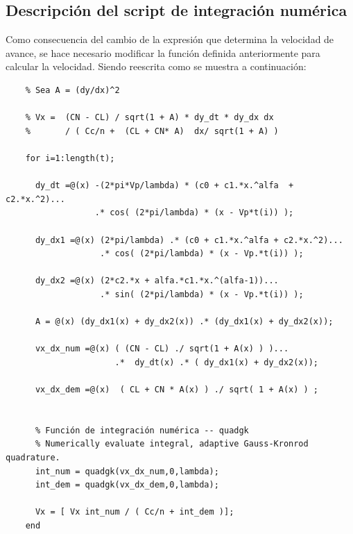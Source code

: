 \subsection{Descripción del script de integración numérica} \label{sec:descripcion_script2}
Como consecuencia del cambio de la expresión que determina la velocidad de avance, se hace necesario modificar la función definida anteriormente para calcular la velocidad. Siendo reescrita como se muestra a continuación:
\begin{lstlisting}[]
	%% Calculo de la velocidad de avance por integración numérica.
    % Sea A = (dy/dx)^2
    
    % Vx =  (CN - CL) / sqrt(1 + A) * dy_dt * dy_dx dx 
    %       / ( Cc/n +  (CL + CN* A)  dx/ sqrt(1 + A) )

    for i=1:length(t);

      dy_dt =@(x) -(2*pi*Vp/lambda) * (c0 + c1.*x.^alfa  + c2.*x.^2)...
                  .* cos( (2*pi/lambda) * (x - Vp*t(i)) );
      
      dy_dx1 =@(x) (2*pi/lambda) .* (c0 + c1.*x.^alfa + c2.*x.^2)...
                   .* cos( (2*pi/lambda) * (x - Vp.*t(i)) );
      
      dy_dx2 =@(x) (2*c2.*x + alfa.*c1.*x.^(alfa-1))...
                   .* sin( (2*pi/lambda) * (x - Vp.*t(i)) ); 

      A = @(x) (dy_dx1(x) + dy_dx2(x)) .* (dy_dx1(x) + dy_dx2(x));

      vx_dx_num =@(x) ( (CN - CL) ./ sqrt(1 + A(x) ) )...
                      .*  dy_dt(x) .* ( dy_dx1(x) + dy_dx2(x));
                  
      vx_dx_dem =@(x)  ( CL + CN * A(x) ) ./ sqrt( 1 + A(x) ) ;
  

      % Función de integración numérica -- quadgk
      % Numerically evaluate integral, adaptive Gauss-Kronrod quadrature.
      int_num = quadgk(vx_dx_num,0,lambda);
      int_dem = quadgk(vx_dx_dem,0,lambda);

      Vx = [ Vx int_num / ( Cc/n + int_dem )];
    end

\end{lstlisting}

